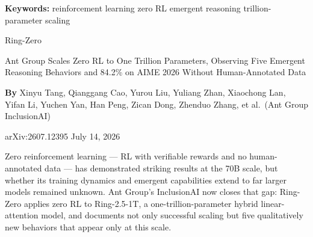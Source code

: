 \documentclass[10pt,twocolumn]{article}
\begin{document}
\setlength{\parindent}{0pt}
\setlength{\parskip}{4pt}

{\small\color{keywordgray}\textbf{Keywords:}
  reinforcement learning \textbullet{}
  zero RL \textbullet{}
  emergent reasoning \textbullet{}
  trillion-parameter scaling}\par\vspace{4pt}

{\LARGE\bfseries\raggedright
  Ring-Zero}\par\vspace{4pt}

{\large\itshape\raggedright
  Ant Group Scales Zero RL to One Trillion Parameters,
  Observing Five Emergent Reasoning Behaviors and 84.2\%
  on AIME 2026 Without Human-Annotated Data}\par\vspace{6pt}

{\small\textbf{By} Xinyu Tang, Qianggang Cao, Yurou Liu, Yuliang Zhan,
  Xiaochong Lan, Yifan Li, Yuchen Yan, Han Peng, Zican Dong,
  Zhenduo Zhang, et al.\ (Ant Group InclusionAI)}\par\vspace{2pt}

{\small\color{keywordgray}arXiv:2607.12395 \textbullet{}
  July 14, 2026}
\par\vspace{2pt}\noindent{\color{rulered}\rule{\columnwidth}{0.6pt}}\vspace{6pt}

Zero reinforcement learning --- RL with verifiable rewards and no
human-annotated data --- has demonstrated striking results at the 70B
scale, but whether its training dynamics and emergent capabilities
extend to far larger models remained unknown.
Ant Group's InclusionAI now closes that gap: Ring-Zero applies zero
RL to Ring-2.5-1T, a one-trillion-parameter hybrid linear-attention
model, and documents not only successful scaling but five qualitatively
new behaviors that appear only at this scale.
\end{document}
